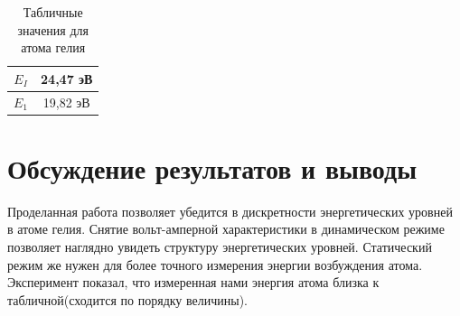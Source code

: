 \documentclass[a4paper,12pt]{article}
\begin{document}
	
		\begin{table}[h!]
			\centering
			\caption{Табличные значения для атома гелия}
			\label{table3}
			\begin{tabular}{|c|c|}
				\hline
				$E_I$                                  & 24,47 эВ \\ \hline
				$E_1$ & 19,82 эВ \\ \hline
			\end{tabular}
		\end{table}
		
		\section{Обсуждение результатов и выводы}
			Проделанная работа позволяет убедится в дискретности энергетических уровней в атоме гелия. Снятие вольт-амперной характеристики в динамическом режиме позволяет наглядно увидеть структуру энергетических уровней. Статический режим же нужен для более точного измерения энергии возбуждения атома. Эксперимент показал, что измеренная нами энергия атома близка к табличной(сходится по порядку величины).
			
\end{document}
